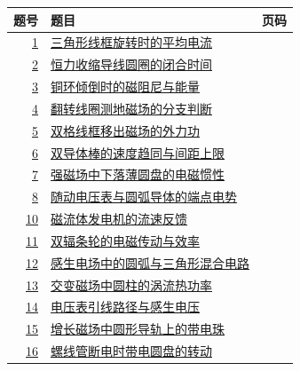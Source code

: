 \documentclass[UTF8,fontset=fandol,a4paper,11pt]{ctexart}
\begin{document}
\begin{longtable}{@{}r p{113mm} r@{}}\toprule 题号 & 题目 & 页码\\\midrule

\hyperref[q:1]{1} & \hyperref[q:1]{三角形线框旋转时的平均电流} & \pageref{q:1} \\

\hyperref[q:2]{2} & \hyperref[q:2]{恒力收缩导线圆圈的闭合时间} & \pageref{q:2} \\

\hyperref[q:3]{3} & \hyperref[q:3]{铜环倾倒时的磁阻尼与能量} & \pageref{q:3} \\

\hyperref[q:4]{4} & \hyperref[q:4]{翻转线圈测地磁场的分支判断} & \pageref{q:4} \\

\hyperref[q:5]{5} & \hyperref[q:5]{双格线框移出磁场的外力功} & \pageref{q:5} \\

\hyperref[q:6]{6} & \hyperref[q:6]{双导体棒的速度趋同与间距上限} & \pageref{q:6} \\

\hyperref[q:7]{7} & \hyperref[q:7]{强磁场中下落薄圆盘的电磁惯性} & \pageref{q:7} \\

\hyperref[q:8]{8} & \hyperref[q:8]{随动电压表与圆弧导体的端点电势} & \pageref{q:8} \\

\hyperref[q:10]{10} & \hyperref[q:10]{磁流体发电机的流速反馈} & \pageref{q:10} \\

\hyperref[q:11]{11} & \hyperref[q:11]{双辐条轮的电磁传动与效率} & \pageref{q:11} \\

\hyperref[q:12]{12} & \hyperref[q:12]{感生电场中的圆弧与三角形混合电路} & \pageref{q:12} \\

\hyperref[q:13]{13} & \hyperref[q:13]{交变磁场中圆柱的涡流热功率} & \pageref{q:13} \\

\hyperref[q:14]{14} & \hyperref[q:14]{电压表引线路径与感生电压} & \pageref{q:14} \\

\hyperref[q:15]{15} & \hyperref[q:15]{增长磁场中圆形导轨上的带电珠} & \pageref{q:15} \\

\hyperref[q:16]{16} & \hyperref[q:16]{螺线管断电时带电圆盘的转动} & \pageref{q:16} \\


\end{longtable}
\end{document}

